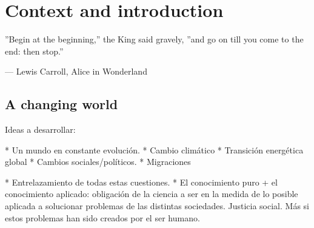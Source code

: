 

\chapter{Context and introduction}

\epigraphfontsize{\small\itshape}
\epigraph{''Begin at the beginning,'' the King said gravely, ''and go on till you
come to the end: then stop.''}{--- \textup{Lewis Carroll}, Alice in Wonderland}

\section{A changing world} 

Ideas a desarrollar:

* Un mundo en constante evolución.
* Cambio climático
* Transición energética global
* Cambios sociales/políticos.
* Migraciones

* Entrelazamiento de todas estas cuestiones.
* El conocimiento puro + el conocimiento aplicado: obligación de la ciencia a ser en la medida de lo posible aplicada a solucionar problemas de las distintas sociedades. Justicia social. Más si estos problemas han sido creados por el ser humano.





